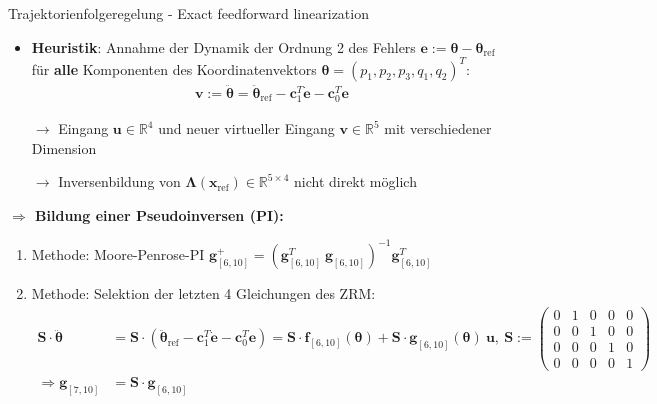 \documentclass[
	ngerman,
	10pt,				%
	aspectratio=169, 	%
	xcolor=dvipsnames
]{beamer}
\begin{document}
\begin{frame}[t,fragile,label=trajektorienregelung_10]{\large Trajektorienfolgeregelung - Exact feedforward linearization}
	
	\begin{itemize}
		\item \textbf{Heuristik}: Annahme der Dynamik der Ordnung 2 des Fehlers $\mathbf{e} := \boldsymbol{\theta} - \boldsymbol{\theta}_{\text{ref}}$ für \textbf{alle} Komponenten des Koordinatenvektors $\boldsymbol{\theta} = (p_1, p_2, p_3, q_1, q_2)^T$:
		\begin{align*}
			\mathbf{v} := \ddot{\boldsymbol{\theta}} = \ddot{\boldsymbol{\theta}}_{\text{ref}} - \mathbf{c}_1^T \dot{\mathbf{e}} - \mathbf{c}_0^T \mathbf{e}
		\end{align*}
		\pause
		\item[$\rightarrow$] Eingang $\mathbf{u} \in \mathbb{R}^{4}$ und neuer virtueller Eingang $\mathbf{v} \in \mathbb{R}^{5}$ mit verschiedener Dimension
		\item[$\rightarrow$] Inversenbildung von $\boldsymbol{\Lambda}(\mathbf{x}_{\text{ref}}) \in \mathbb{R}^{5 \times 4}$ nicht direkt möglich \\
	\end{itemize}
	\bigskip
	\pause
	\textbf{$\Rightarrow$ Bildung einer Pseudoinversen (PI):}
	\begin{enumerate}
		\item Methode: Moore-Penrose-PI \quad $\mathbf{g}_{[6, 10]}^+ =  (\mathbf{g}_{[6, 10]}^T \	\mathbf{g}_{[6, 10]})^{-1} 	\mathbf{g}_{[6, 10]}^T$
		\pause
		\item Methode: Selektion der letzten 4 Gleichungen des ZRM:
		\begin{align*}
			\mathbf{S} \cdot \ddot{\boldsymbol{\theta}} &= \mathbf{S} \cdot (\ddot{\boldsymbol{\theta}}_{\text{ref}} - \mathbf{c}_1^T \dot{\mathbf{e}} - \mathbf{c}_0^T \mathbf{e}) = \mathbf{S} \cdot \mathbf{f}_{[6, 10]}(\boldsymbol{\theta}) + \mathbf{S} \cdot \mathbf{g}_{[6, 10]}(\boldsymbol{\theta}) \ \mathbf{u}, \	
			\mathbf{S} := 
			\left(\begin{smallmatrix}
				0 & 1 & 0 & 0 & 0 \\
				0 & 0 & 1 & 0 & 0 \\
				0 & 0 & 0 & 1 & 0 \\
				0 & 0 & 0 & 0 & 1
			\end{smallmatrix}\right) \\
			\Rightarrow \mathbf{g}_{[7, 10]} &= \mathbf{S} \cdot \mathbf{g}_{[6, 10]}
		\end{align*}
	\end{enumerate}
	
\end{frame}
\end{document}
